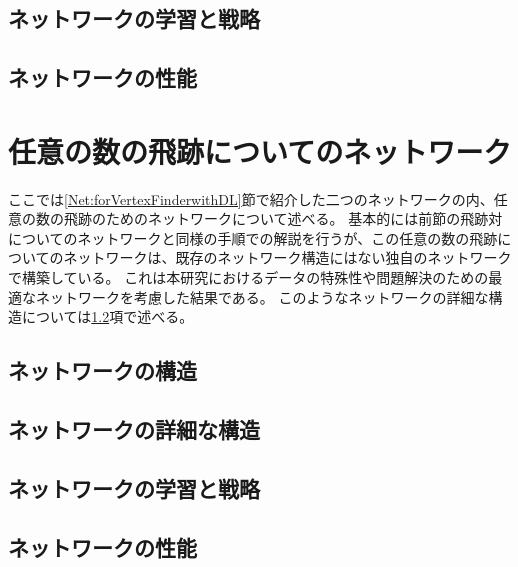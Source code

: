 \subsection{ネットワークの学習と戦略} \label{Net:PM:TrainingandStrategyofPM}

\subsection{ネットワークの性能} \label{Net:PM:PerformanceofPM}

\section{任意の数の飛跡についてのネットワーク} \label{Net:VertexLSTM}

ここでは\ref{Net:forVertexFinderwithDL}節で紹介した二つのネットワークの内、任意の数の飛跡のためのネットワークについて述べる。
基本的には前節の飛跡対についてのネットワークと同様の手順での解説を行うが、この任意の数の飛跡についてのネットワークは、既存のネットワーク構造にはない独自のネットワークで構築している。
これは本研究におけるデータの特殊性や問題解決のための最適なネットワークを考慮した結果である。
このようなネットワークの詳細な構造については\ref{Net:VLSTM:DetailedStructureofVLSTM}項で述べる。


\subsection{ネットワークの構造} \label{Net:VLSTM:StructureofVLSTM}

\subsection{ネットワークの詳細な構造} \label{Net:VLSTM:DetailedStructureofVLSTM}

\subsection{ネットワークの学習と戦略} \label{Net:VLSTM:TrainingandStrategyofVLSTM}

\subsection{ネットワークの性能} \label{Net:VLSTM:PerformanceofVLSTM}

